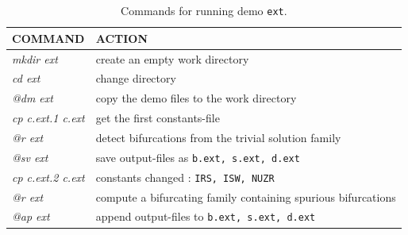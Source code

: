 \documentclass[12pt]{report}
\begin{document}
\begin{table}[htbp]
\begin{center}
\begin{tabular}{| l | l |}
\hline
  COMMAND  & ACTION \\
\hline
  {\it mkdir ext} & create an empty work directory \\ 
  {\it cd ext} & change directory \\
  {\it @dm ext} & copy the demo files to the work directory \\
\hline
  {\it cp c.ext.1 c.ext} & get the first constants-file \\ 
  {\it @r ext} & detect bifurcations from the trivial solution family \\ 
  {\it @sv ext} & save output-files as {\tt b.ext, s.ext, d.ext} \\ 
\hline
  {\it cp c.ext.2 c.ext} & constants changed : {\tt IRS, ISW, NUZR} \\ 
  {\it @r ext} & compute a bifurcating family containing spurious bifurcations \\ 
  {\it @ap ext} & append output-files to {\tt b.ext, s.ext, d.ext} \\ 
\hline
\end{tabular}
\caption{Commands for running demo {\tt ext}.}
\label{tbl:demo_ext}
\end{center}
\end{table}

\newpage
\end{document}
